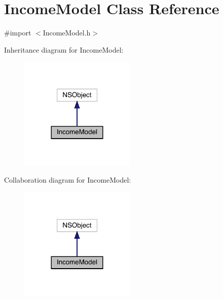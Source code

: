 \hypertarget{interface_income_model}{}\section{Income\+Model Class Reference}
\label{interface_income_model}


{\ttfamily \#import $<$Income\+Model.\+h$>$}



Inheritance diagram for Income\+Model\+:\nopagebreak
\begin{figure}[H]
\begin{center}
\leavevmode
\includegraphics[width=156pt]{interface_income_model__inherit__graph}
\end{center}
\end{figure}


Collaboration diagram for Income\+Model\+:\nopagebreak
\begin{figure}[H]
\begin{center}
\leavevmode
\includegraphics[width=156pt]{interface_income_model__coll__graph}
\end{center}
\end{figure}
